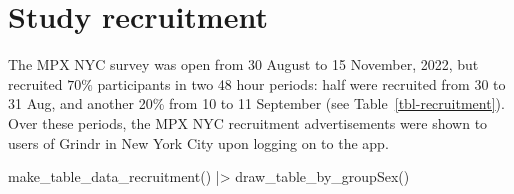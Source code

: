 \documentclass[
  letterpaper,
  DIV=11,
  numbers=noendperiod,
  oneside]{scrreprt}
\newenvironment{Shaded}{\begin{snugshade}}{\end{snugshade}}
\newcommand{\FunctionTok}[1]{\textcolor[rgb]{0.28,0.35,0.67}{#1}}
\newcommand{\NormalTok}[1]{\textcolor[rgb]{0.00,0.23,0.31}{#1}}
\newcommand{\SpecialCharTok}[1]{\textcolor[rgb]{0.37,0.37,0.37}{#1}}
\begin{document}
\hypertarget{study-recruitment}{%
\section{Study recruitment}\label{study-recruitment}}

The MPX NYC survey was open from 30 August to 15 November, 2022, but
recruited \(70\%\) participants in two 48 hour periods: half were
recruited from 30 to 31 Aug, and another 20\% from 10 to 11 September
(see Table~\ref{tbl-recruitment}). Over these periods, the MPX NYC
recruitment advertisements were shown to users of Grindr in New York
City upon logging on to the app.

\begin{Shaded}
\begin{Highlighting}[]
\FunctionTok{make\_table\_data\_recruitment}\NormalTok{()  }\SpecialCharTok{|\textgreater{}}
  \FunctionTok{draw\_table\_by\_groupSex}\NormalTok{()}
\end{Highlighting}
\end{Shaded}
\end{document}
